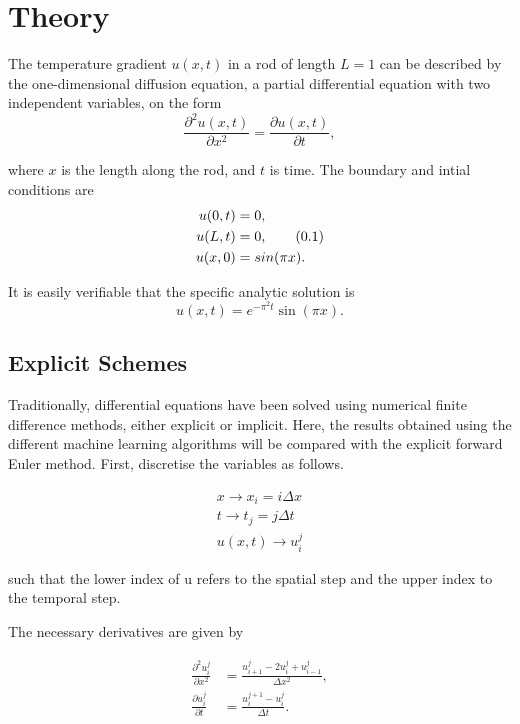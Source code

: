 \documentclass[multicolumn, 10pt]{extarticle}
\newcommand\numberthis{\addtocounter{equation}{1}\tag{\theequation}}
\begin{document}
\section{Theory}

The temperature gradient $u(x, t)$ in a rod of length $L=1$ can be described by the one-dimensional diffusion equation, a partial differential equation with two independent variables, on the form
\begin{equation}\label{eq:diff}
	\frac{\partial^2 u(x, t) }{\partial x^2} = \frac{\partial u(x, t)}{\partial t},
\end{equation}

where $x$ is the length along the rod, and $t$ is time. The boundary and intial conditions are
\begin{align*}\label{eq:boundary}
	u(0, t) & = 0,             \\
	u(L, t) & = 0, \numberthis \\
	u(x, 0) & = sin(\pi x).
\end{align*}

It is easily verifiable that the specific analytic solution is
\begin{equation}\label{eq:anal}
	u(x, t) = e^{-\pi^2t}\sin(\pi x).
\end{equation}

\subsection{Explicit Schemes}
Traditionally, differential equations have been solved using numerical finite difference methods, either explicit or implicit. Here, the results obtained using the different machine learning algorithms will be compared with the explicit forward Euler method. First, discretise the variables as follows.

\begin{align*}
	x \rightarrow x_{i} = i\Delta x  \\
	t \rightarrow t_{j} = j \Delta t \\
	u(x, t)  \rightarrow u_{i}^{j}
\end{align*}

such that the lower index of u refers to the spatial step and the upper index to the temporal step.

The necessary derivatives are given by

\begin{align*}
	\frac{\partial^2u_i^j}{\partial x^2} & = \frac{u_{i+1}^{j} - 2u_{i}^{j} + u_{i-1}^{j}}{\Delta x^{2}}, \\
	\frac{\partial u_i^j}{\partial t}    & = \frac{u_{i}^{j+1} - u_{i}^{j}}{\Delta t}.                    \\
\end{align*}
\end{document}
